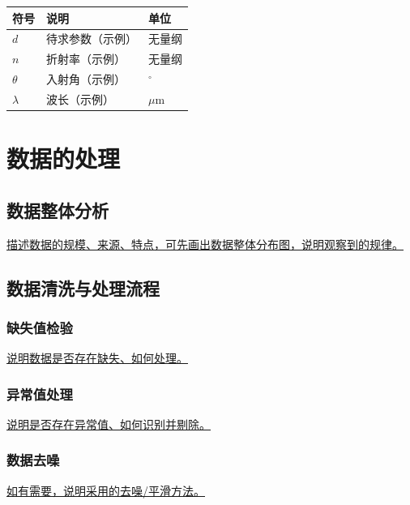 \documentclass[a4paper,12pt]{article}
\begin{document}
\begin{table}[H]
    \centering
    \setlength{\heavyrulewidth}{1.5pt}  %
    \setlength{\lightrulewidth}{1pt}    %
    \captionsetup{skip=0pt}
    \begin{tabularx}{\textwidth}{>{\centering\arraybackslash}X>{\centering\arraybackslash}X>{\centering\arraybackslash}X}
        \toprule[1.5pt]
        \textbf{符号} & \textbf{说明} & \textbf{单位} \\
        \midrule[1pt]
        $d$        & 待求参数（示例） & 无量纲 \\
        $n$        & 折射率（示例）   & 无量纲 \\
        $\theta$   & 入射角（示例）   & $^\circ$ \\
        $\lambda$  & 波长（示例）     & $\mu$m \\
        \bottomrule[1.5pt]
    \end{tabularx}
\end{table}

\section{数据的处理}

\subsection{数据整体分析}
\underline{描述数据的规模、来源、特点，可先画出数据整体分布图，说明观察到的规律。}

\subsection{数据清洗与处理流程}

\subsubsection{缺失值检验}
\underline{说明数据是否存在缺失、如何处理。}

\subsubsection{异常值处理}
\underline{说明是否存在异常值、如何识别并剔除。}

\subsubsection{数据去噪}
\underline{如有需要，说明采用的去噪/平滑方法。}
\end{document}
